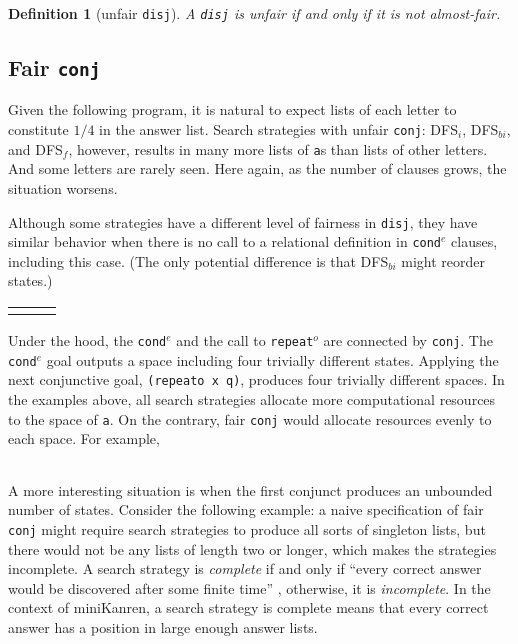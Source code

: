\documentclass[acmlarge, review=true]{acmart}
\newcommand{\conde}{\texttt{cond$^e$}}
\newcommand{\conj}{\texttt{conj}}
\newcommand{\disj}{\texttt{disj}}
\newcommand{\repeato}{\texttt{repeat$^o$}}
\newcommand{\DFSi }[0]{DFS$_{i}$}
\newcommand{\DFSf }[0]{DFS$_{f}$}
\newcommand{\DFSbi}[0]{DFS$_{bi}$}
\newtheorem{defn}{Definition}[section]
\begin{document}
\begin{defn}[unfair \disj{}]
A \disj{} is unfair if and only if it is not almost-fair.
\end{defn}

\subsection{Fair \texttt{conj}}
\label{sec:fairconj}

Given the following program, it is natural to expect lists of each letter to
constitute $1/4$ in the answer list. Search strategies with unfair \conj{}:
\DFSi, \DFSbi, and \DFSf, however, results in many more lists of \texttt{a}s 
than 
lists of other letters. And some letters are rarely seen. Here again, as the
number of clauses grows, the situation worsens. 

Although some strategies have a different level of fairness in \disj{}, they 
have similar behavior when there is no call to a relational definition 
in \conde{} clauses, including this case. (The only potential difference is 
that \DFSbi{} might reorder states.)

\begin{center}
\begin{tabular}{l|c|r}
     &
     &
     \\
\end{tabular}
\end{center}

Under the hood, the \conde{} and the call to \repeato{} are connected by 
\conj{}. The \conde{} goal outputs a space including four trivially 
different states. 
Applying the next conjunctive goal, \texttt{(repeato x q)}, produces four 
trivially different spaces.
In the examples above, all search strategies allocate more computational 
resources to the space of \texttt{a}. On the contrary, fair \conj{} 
would allocate resources evenly to each space. For example,

\begin{center}
	\begin{tabular}{c}
		
	\end{tabular}
\end{center}

A more interesting situation is when the first conjunct produces an unbounded
number of states. Consider the following example: a naive specification of 
fair \conj{} 
might require search strategies to produce all sorts of singleton lists, but 
there
would not be any lists of length two or longer, which makes the strategies 
incomplete. 
A search strategy is \emph{complete} if and only if ``every correct answer 
would be discovered after some finite time'' \cite{seres1999algebra}, 
otherwise, it is \emph{incomplete}. In the 
context of miniKanren, a search strategy is complete means that every correct 
answer has a position in large enough answer lists.
\end{document}
